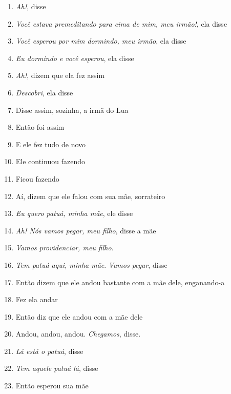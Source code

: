 \begin{enumerate}
\begin{center}\end{center}

\item \textit{Ah!}, disse
\item \textit{Você estava premeditando para cima de mim, meu irmão!}, ela disse
\item \textit{Você esperou por mim dormindo, meu irmão}, ela disse
\item \textit{Eu dormindo e você esperou}, ela disse
\item \textit{Ah!}, dizem que ela fez assim
\item \textit{Descobri}, ela disse
\item Disse assim, sozinha, a irmã do Lua

\begin{center}\end{center}

\item Então foi assim
\item E ele fez tudo de novo
\item Ele continuou fazendo
\item Ficou fazendo

\begin{center}\end{center}

\item Aí, dizem que ele falou com sua mãe, sorrateiro
\item \textit{Eu quero patuá, minha mãe}, ele disse
\item \textit{Ah! Nós vamos pegar, meu filho}, disse a mãe
\item \textit{Vamos providenciar, meu filho}.
\item \textit{Tem patuá aqui, minha mãe}. \textit{Vamos pegar}, disse
\item Então dizem que ele andou bastante com a mãe dele, enganando-a
\item Fez ela andar
\item Então diz que ele andou com a mãe dele
\item Andou, andou, andou. \textit{Chegamos}, disse.
\item \textit{Lá está o patuá}, disse
\item \textit{Tem aquele patuá lá}, disse
\item Então esperou sua mãe

\begin{center}\end{center}


\end{enumerate}
